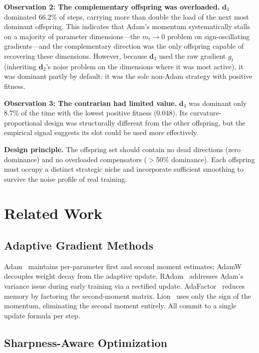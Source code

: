 \documentclass[12pt]{article}
\newcommand{\warnbox}[1]{%
  \begin{tcolorbox}[warnstyle]
    #1
  \end{tcolorbox}
}
\begin{document}
\textbf{Observation 2: The complementary offspring was overloaded.}
$\mathbf{d}_3$ dominated 66.2\% of steps, carrying more than double
the load of the next most dominant offspring.
This indicates that Adam's momentum systematically stalls on
a majority of parameter dimensions---the $m_t \to 0$ problem on
sign-oscillating gradients---and the complementary direction was the
only offspring capable of recovering these dimensions.
However, because $\mathbf{d}_3$ used the raw gradient $g_t$ (inheriting
$\mathbf{d}_2$'s noise problem on the dimensions where it was most
active), it was dominant partly by default: it was the sole non-Adam
strategy with positive fitness.

\textbf{Observation 3: The contrarian had limited value.}
$\mathbf{d}_4$ was dominant only 8.7\% of the time with the lowest
positive fitness (0.048).
Its curvature-proportional design was structurally different from the
other offspring, but the empirical signal suggests its slot could be
used more effectively.

\medskip

\warnbox{%
\textbf{Design principle.}
The offspring set should contain no dead directions (zero dominance)
and no overloaded compensators ($>$50\% dominance).
Each offspring must occupy a distinct strategic niche and incorporate
sufficient smoothing to survive the noise profile of real training.
}


\section{Related Work}
\label{sec:related}

\subsection{Adaptive Gradient Methods}

Adam~\cite{kingma2015adam} maintains per-parameter first and second
moment estimates; AdamW~\cite{loshchilov2019decoupled} decouples weight
decay from the adaptive update.
RAdam~\cite{liu2020radam} addresses Adam's variance issue during early
training via a rectified update.
AdaFactor~\cite{shazeer2018adafactor} reduces memory by factoring the
second-moment matrix.
Lion~\cite{chen2024lion} uses only the sign of the momentum, eliminating
the second moment entirely.
All commit to a single update formula per step.

\subsection{Sharpness-Aware Optimization}
\end{document}
